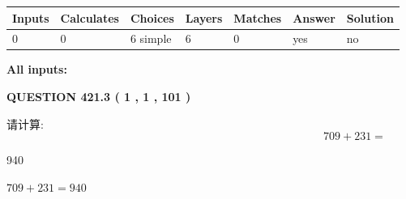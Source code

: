 \documentclass{ctexart}
\begin{document}
 
\noindent{}
 
 
   
   
   
   
\noindent\begin{tabular}{|l|l|l|l|l|l|l|}
 \hline
Inputs & Calculates & Choices & Layers & Matches & Answer & Solution \\ \hline
 0  & 
 0  & 
 6
  simple  
  & 
 6  & 
 0  & 
  yes & 
  no 
  \\ \hline
 \end{tabular}
   
   
   
   
\noindent{}
   
   
   
   
\noindent\vspace{0.1in}\hspace{-0.08in} {\textbf{\Large{All inputs: }}}
   
   
  
\vspace{0.2in}
  
{\textbf{\Large{QUESTION
421.3 
 ( 1 , 1 , 101 )
}}}
  
  
 
请计算:
\begin{equation}
709 +  %
231 = \nonumber
\end{equation}
 
 
 
\noindent{}
 
 

940
 
 
\noindent{}
 
 

 
 
 
\noindent{}
 
 

$ %
709 +  %
231=   %
940$
 
 
\noindent{}
 
 

 
   
\end{document}
